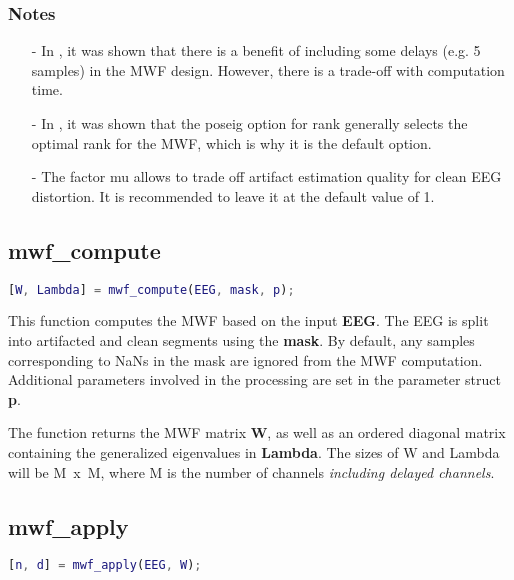 \documentclass[11pt]{article}
\begin{document}
\subsubsection{Notes}

\begin{itemize}[noitemsep]
\item[-] In \cite{somers2018generic}, it was shown that there is a benefit of including some delays (e.g. 5 samples) in the MWF design. However, there is a trade-off with computation time.
\item[-] In \cite{somers2018generic}, it was shown that the poseig option for rank generally selects the optimal rank for the MWF, which is why it is the default option.
\item[-] The factor mu allows to trade off artifact estimation quality for clean EEG distortion. It is recommended to leave it at the default value of 1.
\end{itemize}

\subsection{mwf\_compute}
\label{mwfcompute}

\begin{lstlisting}[frame=single, language=matlab]
[W, Lambda] = mwf_compute(EEG, mask, p);
\end{lstlisting}

This function computes the MWF based on the input \textbf{EEG}. The EEG is split into artifacted and clean segments using the \textbf{mask}. By default, any samples corresponding to NaNs in the mask are ignored from the MWF computation. Additional parameters involved in the processing are set in the parameter struct \textbf{p}.

The function returns the MWF matrix \textbf{W}, as well as an ordered diagonal matrix containing the generalized eigenvalues in \textbf{Lambda}. The sizes of W and Lambda will be M~x~M, where M is the number of channels \emph{including delayed channels}. 

\subsection{mwf\_apply}

\begin{lstlisting}[frame=single, language=matlab]
[n, d] = mwf_apply(EEG, W);
\end{lstlisting}
\end{document}
